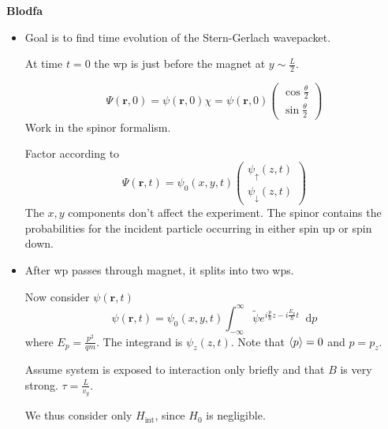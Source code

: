 \documentclass[11pt, a4paper]{article}
\newcommand{\diff}{\mathop{}\!\mathrm{d}} %
\renewcommand{\vec}[1]{\bm{#1}}  %
\newcommand{\ua}{\uparrow}  %
\newcommand{\da}{\downarrow}  %
\renewcommand{\r}{\vec{r}}  %
\newcommand{\p}{\psi}  %
\begin{document}
\iffalse
\textbf{Blodfa}
\begin{itemize}
    \item Goal is to find time evolution of the Stern-Gerlach wavepacket. 
    



    At time $ t = 0 $ the wp is just before the magnet at $ y \sim \frac{L}{2} $. 

    \begin{equation*}
        \Psi(\r, 0) = \psi(\r, 0)\chi = \psi(\r, 0) 
        \begin{pmatrix}
            \cos \frac{\theta}{2}\\
            \sin \frac{\theta}{2}
        \end{pmatrix}
    \end{equation*}
    Work in the spinor formalism. 

    Factor according to 
    \begin{equation*}
        \Psi(\r, t) = \psi_{0}(x, y, t) 
        \begin{pmatrix}
            \psi_{\ua}(z, t)\\
            \psi_{\da}(z, t)
        \end{pmatrix}
    \end{equation*}
    The $ x, y $ components don't affect the experiment. The spinor contains the probabilities for the incident particle occurring in either spin up or spin down.
    
    \item After wp passes through magnet, it splits into two wps. 

    Now consider $ \psi(\r, t) $
    \begin{equation*}
        \p(\r, t) = \psi_{0}(x, y, t) \int_{-\infty}^{\infty} \tilde{\psi}e^{i \frac{p}{\hbar}z - i \frac{E_{p}}{\hbar}t}\diff p 
    \end{equation*}
    where $ E_{p} = \frac{p^{2}}{qm} $. The integrand is $ \psi_{z}(z, t) $. Note that $ \ev{p} = 0 $ and $ p = p_{z} $.


    Assume system is exposed to interaction only briefly and that $ B $ is very strong. $ \tau = \frac{L}{v_{y}} $. 
    
    We thus consider only $ H_{\text{int}} $, since $ H_{0} $ is negligible. 


\end{itemize}
\end{document}
